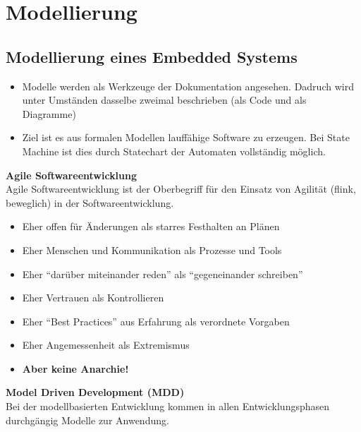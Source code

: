 \section{Modellierung }
\subsection{Modellierung eines Embedded Systems }

\begin{itemize}
	\item Modelle werden als Werkzeuge der Dokumentation angesehen. Dadruch 
	wird unter Umständen dasselbe zweimal beschrieben (als Code und als Diagramme)
	
	\item Ziel ist es aus formalen Modellen lauffähige Software zu erzeugen. Bei 
	State Machine ist dies durch Statechart der Automaten vollständig möglich.
\end{itemize}

\textbf{Agile Softwareentwicklung}\\
Agile Softwareentwicklung ist der Oberbegriff für den Einsatz von Agilität (flink, beweglich) in der Softwareentwicklung.
\begin{itemize}
	\item Eher offen für Änderungen als starres Festhalten an Plänen
	\item Eher Menschen und Kommunikation als Prozesse und Tools
	\item Eher "`darüber miteinander reden"' als "`gegeneinander schreiben"'
	\item Eher Vertrauen als Kontrollieren
	\item Eher "`Best Practices"' aus Erfahrung als verordnete Vorgaben
	\item Eher Angemessenheit als Extremismus
	\item \textbf{Aber keine Anarchie!}
\end{itemize} 


\textbf{Model Driven Development (MDD)}\\
Bei der modellbasierten Entwicklung kommen in allen Entwicklungsphasen durchgängig Modelle zur Anwendung.

